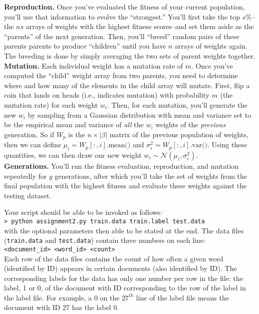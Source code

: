 \documentclass[paper=a4, fontsize=11pt]{scrartcl} %
\numberwithin{figure}{section} %
\numberwithin{table}{section} %
\begin{document}
\textbf{Reproduction.} Once you've evaluated the fitness of your current population, you'll use that information to evolve the ``strongest.'' You'll first take the top $s\%$--the $ns$ arrays of weights with the highest fitness scores--and set them aside as the ``parents'' of the next generation. Then, you'll ``breed'' random pairs of these parents parents to produce ``children'' until you have $n$ arrays of weights again. The breeding is done by simply averaging the two sets of parent weights together. \\

\textbf{Mutation.} Each individual weight has a mutation rate of $m$. Once you've computed the ``child'' weight array from two parents, you need to determine where and how many of the elements in the child array will mutate. First, flip a coin that lands on heads (i.e., indicates mutation) with probability $m$ (the mutation rate) for each weight $w_i$. Then, for each mutation, you'll generate the new $w_i$ by sampling from a Gaussian distribution with mean and variance set to be the empirical mean and variance of \emph{all} the $w_i$ weights of the \emph{previous} generation. So if $W_{p}$ is the $n \times |\beta|$ matrix of the previous population of weights, then we can define $\mu_i = W_p\left[:, i\right]\textrm{.mean()}$ and $\sigma_i^2 = W_p\left[:, i\right]\textrm{.var()}$. Using these quantities, we can then draw our new weight $w_i \sim \mathcal{N}(\mu_i, \sigma_i^2)$. \\

\textbf{Generations.} You'll run the fitness evaluation, reproduction, and mutation repeatedly for $g$ generations, after which you'll take the set of weights from the final population with the highest fitness and evaluate these weights against the testing dataset.

Your script should be able to be invoked as follows: \\

\texttt{> python assignment2.py train.data train.label test.data} \\

with the optional parameters then able to be stated at the end. The data files (\texttt{train.data} and \texttt{test.data}) contain three numbers on each line: \\

\texttt{<document\_id> <word\_id> <count>} \\

Each row of the data files contains the count of how often a given word (identified by ID) appears in certain documents (also identified by ID). The corresponding labels for the data has only one number per row in the file: the label, 1 or 0, of the document with ID corresponding to the row of the label in the label file. For example, a 0 on the $27^{th}$ line of the label file means the document with ID 27 has the label 0. \\
\end{document}
